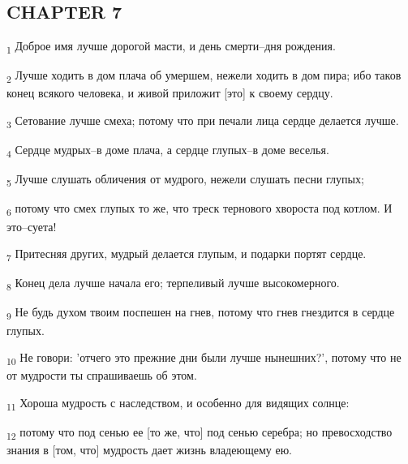 \subsection{CHAPTER 7}
\begin{tcolorbox}
\textsubscript{1} Доброе имя лучше дорогой масти, и день смерти--дня рождения.
\end{tcolorbox}
\begin{tcolorbox}
\textsubscript{2} Лучше ходить в дом плача об умершем, нежели ходить в дом пира; ибо таков конец всякого человека, и живой приложит [это] к своему сердцу.
\end{tcolorbox}
\begin{tcolorbox}
\textsubscript{3} Сетование лучше смеха; потому что при печали лица сердце делается лучше.
\end{tcolorbox}
\begin{tcolorbox}
\textsubscript{4} Сердце мудрых--в доме плача, а сердце глупых--в доме веселья.
\end{tcolorbox}
\begin{tcolorbox}
\textsubscript{5} Лучше слушать обличения от мудрого, нежели слушать песни глупых;
\end{tcolorbox}
\begin{tcolorbox}
\textsubscript{6} потому что смех глупых то же, что треск тернового хвороста под котлом. И это--суета!
\end{tcolorbox}
\begin{tcolorbox}
\textsubscript{7} Притесняя других, мудрый делается глупым, и подарки портят сердце.
\end{tcolorbox}
\begin{tcolorbox}
\textsubscript{8} Конец дела лучше начала его; терпеливый лучше высокомерного.
\end{tcolorbox}
\begin{tcolorbox}
\textsubscript{9} Не будь духом твоим поспешен на гнев, потому что гнев гнездится в сердце глупых.
\end{tcolorbox}
\begin{tcolorbox}
\textsubscript{10} Не говори: 'отчего это прежние дни были лучше нынешних?', потому что не от мудрости ты спрашиваешь об этом.
\end{tcolorbox}
\begin{tcolorbox}
\textsubscript{11} Хороша мудрость с наследством, и особенно для видящих солнце:
\end{tcolorbox}
\begin{tcolorbox}
\textsubscript{12} потому что под сенью ее [то же, что] под сенью серебра; но превосходство знания в [том, что] мудрость дает жизнь владеющему ею.
\end{tcolorbox}
